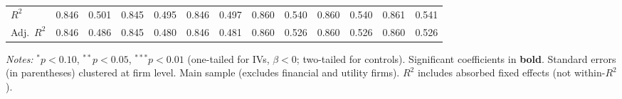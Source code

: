\begin{landscape}
\begin{table}[H]
\begin{tabular}{lcccccccccccc}
$R^2$ & 0.846 & 0.501 & 0.845 & 0.495 & 0.846 & 0.497 & 0.860 & 0.540 & 0.860 & 0.540 & 0.861 & 0.541 \\
Adj.~$R^2$ & 0.846 & 0.486 & 0.845 & 0.480 & 0.846 & 0.481 & 0.860 & 0.526 & 0.860 & 0.526 & 0.860 & 0.526 \\
\bottomrule
\end{tabular}
\begin{minipage}{\linewidth}
\vspace{2pt}\scriptsize
\textit{Notes:} $^{*}p<0.10$, $^{**}p<0.05$, $^{***}p<0.01$ (one-tailed for IVs, $\beta < 0$; two-tailed for controls).
 Significant coefficients in \textbf{bold}.
 Standard errors (in parentheses) clustered at firm level.
 Main sample (excludes financial and utility firms).
 $R^2$ includes absorbed fixed effects (not within-$R^2$).
\end{minipage}
\end{table}
\end{landscape}